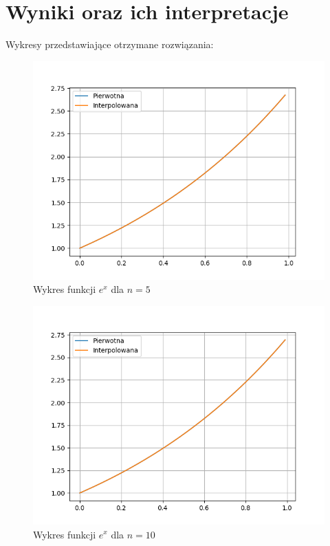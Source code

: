\documentclass[a4paper,14pt]{report}
\begin{document}
  \section{Wyniki oraz ich interpretacje}
    Wykresy przedstawiające otrzymane rozwiązania:
    \begin{figure}[H]
      \includegraphics[scale=0.75]{a-5}
      \centering
      \caption{Wykres funkcji $e^{x}$ dla $n=5$}
    \end{figure}
    \begin{figure}[H]
      \includegraphics[scale=0.75]{a-10}
      \centering
      \caption{Wykres funkcji $e^{x}$ dla $n=10$}
    \end{figure}
\end{document}
